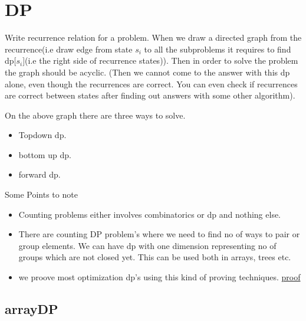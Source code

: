 \documentclass[../Notes.tex]{subfiles}
\begin{document}
\chapter{DP}

Write recurrence relation for a problem. When we draw a directed graph from the recurrence(i.e draw edge from state $s_i$ to all the subproblems it requires to find dp[$s_i$](i.e the right side of recurrence states)). Then in order to solve the problem the graph should be acyclic. (Then we cannot come to the answer with this dp alone, even though the recurrences are correct. You can even check if recurrences are correct between states after finding out answers with some other algorithm).

On the above graph there are three ways to solve.
\begin{itemize}
	\item Topdown dp.
	\item bottom up dp.
	\item forward dp.
\end{itemize}	
Some Points to note
\begin{itemize}
	\item Counting problems either involves combinatorics or dp and nothing else.
	\item There are counting DP problem's where we need to find no of ways to pair or group elements. We can have dp with one dimension representing no of groups which are not closed yet. This can be used both in arrays, trees etc.  
	\item we proove most optimization dp's using this kind of proving techniques.
	\href{Material/dpproof.pdf}{proof}
\end{itemize}

\section{arrayDP}
\end{document}
